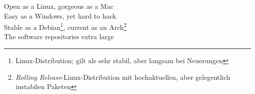 Open as a Linux, gorgeous as a Mac \\
Easy as a Windows, yet hard to hack \\
Stable as a Debian\footnote{\scriptsize Linux-Distribution; gilt als sehr stabil, aber langsam bei Neuerungen}, current as an Arch\footnote{\scriptsize \textit{Rolling Release}-Linux-Distribution mit hochaktuellen, aber gelegentlich instabilen Paketen} \\
The software repositories extra large \\


\vspace*{3cm}

\begin{center}
\end{center}

\vspace*{3cm}

\pagebreak
